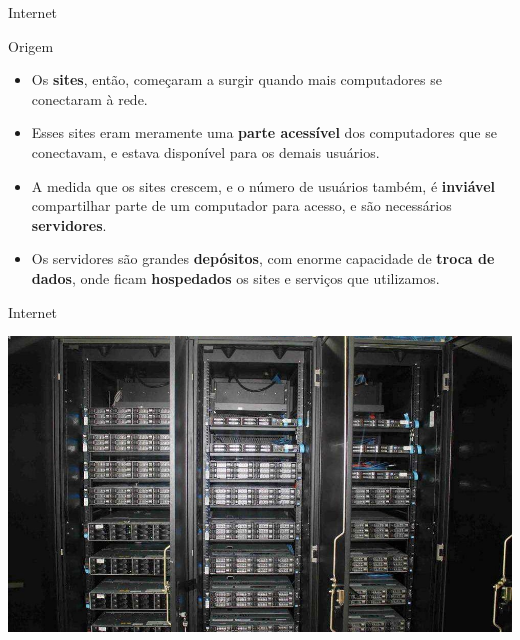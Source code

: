\begin{frame}{Internet}
	\begin{block}{Origem}
		\begin{itemize}
			\item Os \textbf{sites}, então, começaram a surgir quando mais computadores se conectaram à rede.
			\item Esses sites eram meramente uma \textbf{parte acessível} dos computadores que se conectavam, e estava disponível para os demais usuários.
			\item A medida que os sites crescem, e o número de usuários também, é \textbf{inviável} compartilhar parte de um computador para acesso, e são necessários \textbf{servidores}.
			\item Os servidores são grandes \textbf{depósitos}, com enorme capacidade de \textbf{troca de dados}, onde ficam \textbf{hospedados} os sites e serviços que utilizamos.
		\end{itemize}
	\end{block}

\end{frame}


\begin{frame}{Internet}

	\centering
	\includegraphics[width=1\linewidth]{Figuras/Ch03/fig7.3}
\end{frame}


